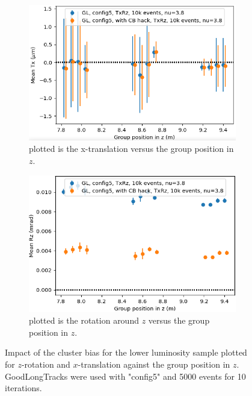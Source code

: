 \begin{figure}[htbp]
  \centering
  \begin{subfigure}[b]{0.48\textwidth}
    \centering
    \includegraphics[width=\textwidth]{plots/renewed_plots/e5/4_19_3.png}
    \caption{plotted is the x-translation versus the group position in $z$.}
    \label{fig:cbTxlow}
  \end{subfigure}
  \hfill
  \begin{subfigure}[b]{0.48\textwidth}
    \centering
    \includegraphics[width=\textwidth]{plots/renewed_plots/e5/4_19_4.png}
    \caption{plotted is the rotation around $z$ versus the group position in $z$.}
    \label{fig:cbRzlow}
  \end{subfigure}
  \caption{Impact of the cluster bias for the lower luminosity sample plotted for $z$-rotation and $x$-translation against the group position in $z$. GoodLongTracks were used with "config5" and 5000 events for 10 iterations.}
  \label{fig:cblow}
\end{figure}

